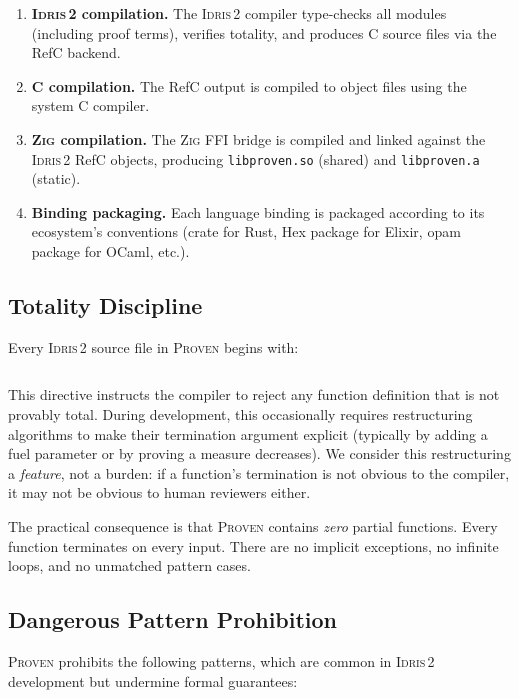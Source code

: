 \documentclass[11pt,a4paper]{article}
\newcommand{\proven}{\textsc{Proven}}
\newcommand{\idris}{\textsc{Idris\,2}}
\newcommand{\zig}{\textsc{Zig}}
\newcommand{\code}[1]{\texttt{#1}}
\begin{document}
\begin{enumerate}[nosep]
  \item \textbf{\idris{} compilation.} The \idris{} compiler type-checks
    all modules (including proof terms), verifies totality, and produces
    C source files via the RefC backend.
  \item \textbf{C compilation.} The RefC output is compiled to object
    files using the system C compiler.
  \item \textbf{\zig{} compilation.} The \zig{} FFI bridge is compiled
    and linked against the \idris{} RefC objects, producing
    \code{libproven.so} (shared) and \code{libproven.a} (static).
  \item \textbf{Binding packaging.} Each language binding is packaged
    according to its ecosystem's conventions (crate for Rust, Hex package
    for Elixir, opam package for OCaml, etc.).
\end{enumerate}

\subsection{Totality Discipline}

Every \idris{} source file in \proven{} begins with:

\begin{lstlisting}[language=Idris2, numbers=none]
%default total
\end{lstlisting}

This directive instructs the compiler to reject any function definition
that is not provably total. During development, this occasionally
requires restructuring algorithms to make their termination argument
explicit (typically by adding a fuel parameter or by proving a measure
decreases). We consider this restructuring a \emph{feature}, not a burden:
if a function's termination is not obvious to the compiler, it may not
be obvious to human reviewers either.

The practical consequence is that \proven{} contains \emph{zero} partial
functions. Every function terminates on every input. There are no implicit
exceptions, no infinite loops, and no unmatched pattern cases.

\subsection{Dangerous Pattern Prohibition}

\proven{} prohibits the following patterns, which are common in \idris{}
development but undermine formal guarantees:
\end{document}
